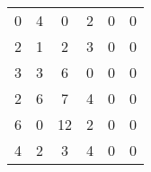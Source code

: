 \begin{tabular}{cccccc}
0      & 4      & 0      & 2      & 0      & 0 \\
2      & 1      & 2      & 3      & 0      & 0 \\
3      & 3      & 6      & 0      & 0      & 0 \\
2      & 6      & 7      & 4      & 0      & 0 \\
6      & 0      & 12     & 2      & 0      & 0 \\
4      & 2      & 3      & 4      & 0      & 0 \bigstrut[b]\\
\hline
\hline
\end{tabular}%
